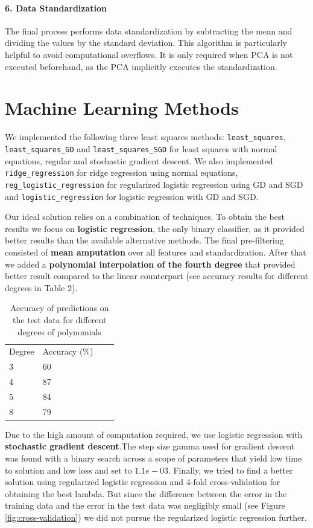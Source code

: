 \documentclass[fleqn,9 pt]{SelfArx} %
\begin{document}
\begin{sloppypar}
\paragraph{6. Data Standardization} The final process performs data standardization by subtracting the mean and dividing the values by the standard deviation. This algorithm is particularly helpful to avoid computational overflows. It is only required when PCA is not executed beforehand, as the PCA implicitly executes the standardization.

\section{Machine Learning Methods}
\label{sec-ML}

We implemented the following three least squares methods: \texttt{least\_squares}, \texttt{least\_squares\_GD} and \texttt{least\_squares\_SGD} for least squares with normal equations, regular and stochastic gradient descent. We also implemented \texttt{ridge\_regression} for ridge regression using normal equations, \texttt{reg\_logistic\_regression} for regularized logistic regression using GD and SGD and \texttt{logistic\_regression} for logistic regression with GD and SGD.

Our ideal solution relies on a combination of techniques. To obtain the best results we focus on \textbf{logistic regression}, the only binary classifier, as it provided better results than the available alternative methods. The final pre-filtering consisted of \textbf{mean amputation} over all features and standardization. After that we added a \textbf{polynomial interpolation of the fourth degree} that provided better result compared to the linear counterpart (see accuracy results for different degrees in Table 2). 

\begin{table}
\begin{tabular}{ l l l l | }
Degree & Accuracy (\%) \\
3 & 60 \\
4 & 87 \\
5 & 84 \\
8 & 79 \\
\end{tabular}
\caption{\small Accuracy of predictions on the test data for different degrees of polynomials}
\end{table}

Due to the high amount of computation required, we use logistic regression with \textbf{stochastic gradient descent}.The step size gamma used for gradient descent was found with a binary search across a scope of parameters that yield low time to solution and low loss and set to $1.1e-03$. Finally, we tried to find a better solution using regularized logistic regression and 4-fold cross-validation for obtaining the best lambda. But since the difference between the error in the training data and the error in the test data was negligibly small (see Figure \ref{fig:cross-validation}) we did not pursue the regularized logistic regression further.


\end{sloppypar}
\end{document}
